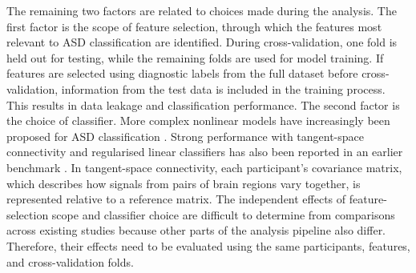 The remaining two factors are related to choices made during the analysis. The first factor is the scope of feature selection, through which the features most relevant to ASD classification are identified. During cross-validation, one fold is held out for testing, while the remaining folds are used for model training. If features are selected using diagnostic labels from the full dataset before cross-validation, information from the test data is included in the training process. This results in data leakage and  classification performance. The second factor is the choice of classifier. More complex nonlinear models have increasingly been proposed for ASD classification \citep{Liuetal2024MADE,Tangetal2025GNNLSTM,Tangetal2026CASGNN}. Strong performance with tangent-space connectivity and regularised linear classifiers has also been reported in an earlier benchmark \citep{Dadietal2019}. In tangent-space connectivity, each participant's covariance matrix, which describes how signals from pairs of brain regions vary together, is represented relative to a reference matrix. The independent effects of feature-selection scope and classifier choice are difficult to determine from comparisons across existing studies because other parts of the analysis pipeline also differ. Therefore, their effects need to be evaluated using the same participants, features, and cross-validation folds.


